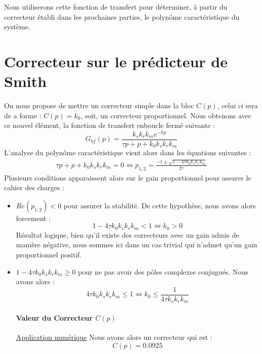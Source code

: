 Nous utiliserons cette fonction de transfert pour déterminer, à partir du correcteur établi dans les prochaines parties, le polynôme caractéristique du système. 

\section{Correcteur sur le prédicteur de Smith}
On nous propose de mettre un correcteur simple dans la bloc $C(p)$, celui ci sera de a forme : $C(p) = k_0$, soit, un correcteur proportionnel. Nous obtenons avec ce nouvel élément, la fonction de transfert enboucle fermé suivante :
\begin{equation}
G_{bf}(p) = \frac{k_sk_rk_me^{-hp}}{\tau p +p+k_0k_sk_rk_m}
\end{equation}
L'analyse du polynôme caractéristique vient alors dans les équations suivantes :
\begin{align*}
\tau p + p + k_0k_sk_rk_m = 0 \Leftrightarrow p_{1,2} = \frac{-1 \pm \sqrt{1-4\tau k_0k_sk_rk_m}}{2\tau}
\end{align*}
Plusieurs conditions apparaissent alors sur le gain proportionnel pour assurer le cahier des charges : \begin{itemize}
\item [\textbullet]$Re(p_{1,2}) < 0$ pour assurer la stabilité. De cette hypothèse, nous avons alors forcement :\begin{equation}
1-4\tau k_0k_sk_rk_m < 1 \Leftrightarrow k_0 > 0
\end{equation}
Résultat logique, bien qu'il existe des correcteurs avec un gain admis de manière négative, nous sommes ici dans un cas trivial qui n'admet qu'un gain proportionnel positif.
\item [\textbullet] $1-4\tau k_0k_sk_rk_m \geq 0$ pour ne pas avoir des pôles complexes conjugués. Nous avons alors :
\begin{equation}
4\tau k_0k_sk_rk_m \leq 1 \Leftrightarrow k_0 \leq \frac{1}{4\tau k_sk_rk_m}
\end{equation}
\paragraph*{Valeur du Correcteur $C(p)$} \underline{Application numérique} Nous avons alors un correcteur qui est : \begin{equation}\label{eqn:corPredicteurSmith}
C(p) = 0.0925
\end{equation}
\end{itemize}